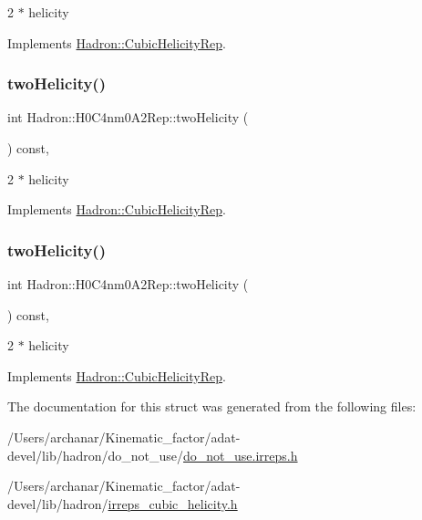 2 $\ast$ helicity 

Implements \mbox{\hyperlink{structHadron_1_1CubicHelicityRep_af507aa56fc2747eacc8cb6c96db31ecc}{Hadron\+::\+Cubic\+Helicity\+Rep}}.

\mbox{\label{structHadron_1_1H0C4nm0A2Rep_a9c95fc4b1759a69a69dd2406a3e0a36b}} 
\subsubsection{\texorpdfstring{twoHelicity()}{twoHelicity()}\hspace{0.1cm}{\footnotesize\ttfamily [2/3]}}
{\footnotesize\ttfamily int Hadron\+::\+H0\+C4nm0\+A2\+Rep\+::two\+Helicity (\begin{DoxyParamCaption}{ }\end{DoxyParamCaption}) const\hspace{0.3cm}{\ttfamily [inline]}, {\ttfamily [virtual]}}

2 $\ast$ helicity 

Implements \mbox{\hyperlink{structHadron_1_1CubicHelicityRep_af507aa56fc2747eacc8cb6c96db31ecc}{Hadron\+::\+Cubic\+Helicity\+Rep}}.

\mbox{\label{structHadron_1_1H0C4nm0A2Rep_a9c95fc4b1759a69a69dd2406a3e0a36b}} 
\subsubsection{\texorpdfstring{twoHelicity()}{twoHelicity()}\hspace{0.1cm}{\footnotesize\ttfamily [3/3]}}
{\footnotesize\ttfamily int Hadron\+::\+H0\+C4nm0\+A2\+Rep\+::two\+Helicity (\begin{DoxyParamCaption}{ }\end{DoxyParamCaption}) const\hspace{0.3cm}{\ttfamily [inline]}, {\ttfamily [virtual]}}

2 $\ast$ helicity 

Implements \mbox{\hyperlink{structHadron_1_1CubicHelicityRep_af507aa56fc2747eacc8cb6c96db31ecc}{Hadron\+::\+Cubic\+Helicity\+Rep}}.



The documentation for this struct was generated from the following files\+:\begin{DoxyCompactItemize}
\item 
/\+Users/archanar/\+Kinematic\+\_\+factor/adat-\/devel/lib/hadron/do\+\_\+not\+\_\+use/\mbox{\hyperlink{adat-devel_2lib_2hadron_2do__not__use_2do__not__use_8irreps_8h}{do\+\_\+not\+\_\+use.\+irreps.\+h}}\item 
/\+Users/archanar/\+Kinematic\+\_\+factor/adat-\/devel/lib/hadron/\mbox{\hyperlink{adat-devel_2lib_2hadron_2irreps__cubic__helicity_8h}{irreps\+\_\+cubic\+\_\+helicity.\+h}}\end{DoxyCompactItemize}
